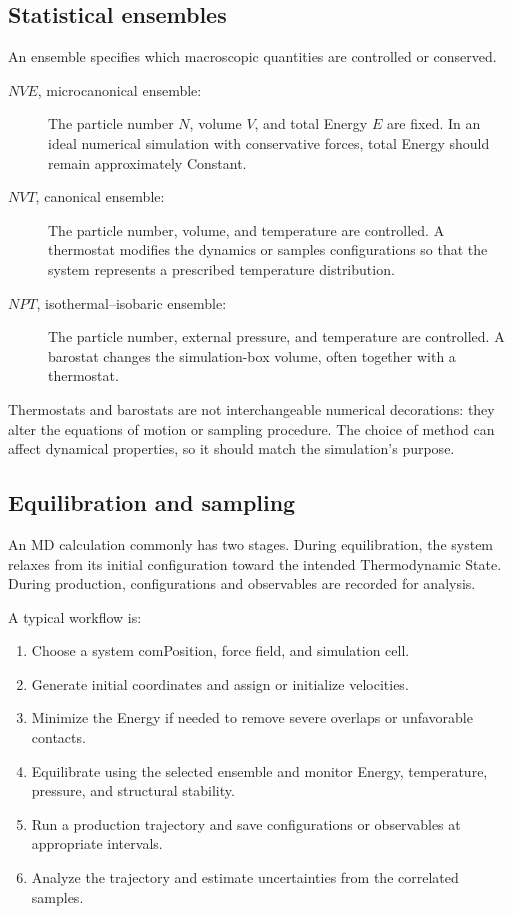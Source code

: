 \documentclass[a4paper, 10pt, onepage]{elegantbook}
\begin{document}
{\subsection{Statistical ensembles}

An ensemble specifies which macroscopic quantities are controlled or
conserved.

\begin{description}
  \item[\(NVE\), microcanonical ensemble:]
  The particle number \(N\), volume \(V\), and total Energy \(E\) are
  fixed. In an ideal numerical simulation with conservative forces, total
  Energy should remain approximately Constant.

  \item[\(NVT\), canonical ensemble:]
  The particle number, volume, and temperature are controlled. A thermostat
  modifies the dynamics or samples configurations so that the system
  represents a prescribed temperature distribution.

  \item[\(NPT\), isothermal--isobaric ensemble:]
  The particle number, external pressure, and temperature are controlled.
  A barostat changes the simulation-box volume, often together with a
  thermostat.
\end{description}

Thermostats and barostats are not interchangeable numerical decorations:
they alter the equations of motion or sampling procedure. The choice of
method can affect dynamical properties, so it should match the simulation's
purpose.

\subsection{Equilibration and sampling}

An MD calculation commonly has two stages. During equilibration, the system
relaxes from its initial configuration toward the intended Thermodynamic
State. During production, configurations and observables are recorded for
analysis.

A typical workflow is:
\begin{enumerate}
  \item Choose a system comPosition, force field, and simulation cell.
  \item Generate initial coordinates and assign or initialize velocities.
  \item Minimize the Energy if needed to remove severe overlaps or
        unfavorable contacts.
  \item Equilibrate using the selected ensemble and monitor Energy,
        temperature, pressure, and structural stability.
  \item Run a production trajectory and save configurations or observables
        at appropriate intervals.
  \item Analyze the trajectory and estimate uncertainties from the
        correlated samples.
\end{enumerate}

}
\end{document}
